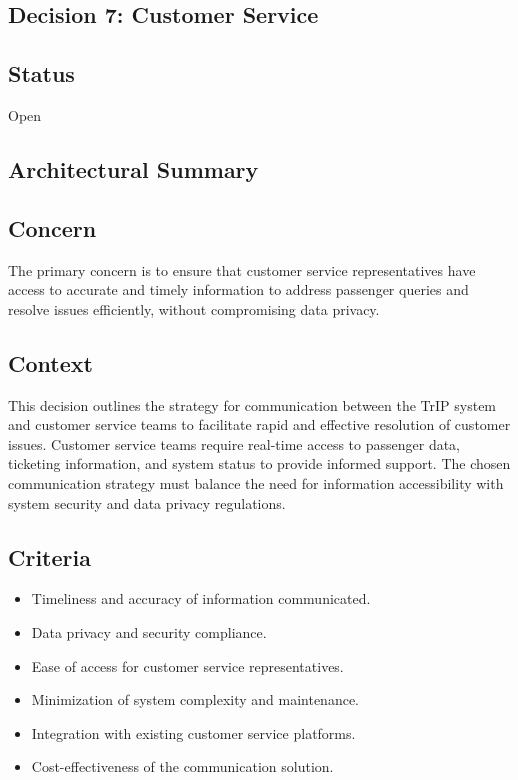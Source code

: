\subsection{Decision 7: Customer Service}

\subsection*{Status}
Open

\subsection*{Architectural Summary}

\subsection*{Concern}
The primary concern is to ensure that customer service representatives have access to accurate and timely information to address passenger queries and resolve issues efficiently, without compromising data privacy.

\subsection*{Context}
This decision outlines the strategy for communication between the TrIP system and customer service teams to facilitate rapid and effective resolution of customer issues.
Customer service teams require real-time access to passenger data, ticketing information, and system status to provide informed support. The chosen communication strategy must balance the need for information accessibility with system security and data privacy regulations.

\subsection*{Criteria}
\begin{itemize}
    \item Timeliness and accuracy of information communicated.
    \item Data privacy and security compliance.
    \item Ease of access for customer service representatives.
    \item Minimization of system complexity and maintenance.
    \item Integration with existing customer service platforms.
    \item Cost-effectiveness of the communication solution.
\end{itemize}

